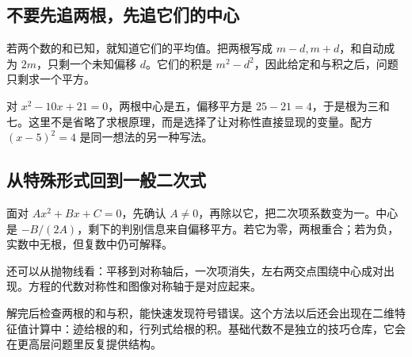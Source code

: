 \subsection*{不要先追两根，先追它们的中心}
若两个数的和已知，就知道它们的平均值。把两根写成 $m-d,m+d$，和自动成为 $2m$，只剩一个未知偏移 $d$。它们的积是 $m^2-d^2$，因此给定和与积之后，问题只剩求一个平方。

对 $x^2-10x+21=0$，两根中心是五，偏移平方是 $25-21=4$，于是根为三和七。这里不是省略了求根原理，而是选择了让对称性直接显现的变量。配方 $(x-5)^2=4$ 是同一想法的另一种写法。

\subsection*{从特殊形式回到一般二次式}
面对 $Ax^2+Bx+C=0$，先确认 $A\ne0$，再除以它，把二次项系数变为一。中心是 $-B/(2A)$，剩下的判别信息来自偏移平方。若它为零，两根重合；若为负，实数中无根，但复数中仍可解释。

还可以从抛物线看：平移到对称轴后，一次项消失，左右两交点围绕中心成对出现。方程的代数对称性和图像对称轴于是对应起来。

解完后检查两根的和与积，能快速发现符号错误。这个方法以后还会出现在二维特征值计算中：迹给根的和，行列式给根的积。基础代数不是独立的技巧仓库，它会在更高层问题里反复提供结构。
